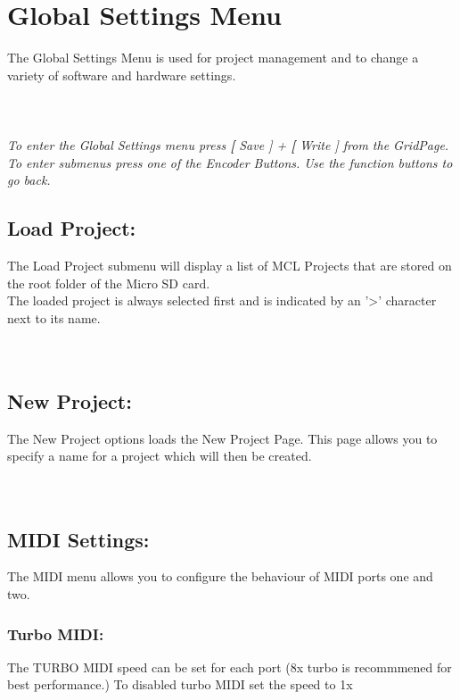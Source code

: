 \chapter{Global Settings Menu}
The Global Settings Menu is used for project management and to change a variety of software and hardware settings.\\\\
\\\\
\textit{To enter the Global Settings menu press \textbf[ Save ] + \textbf[ Write ] from the GridPage.\\
To enter submenus press one of the Encoder Buttons. Use the function buttons to go back.}
\section{Load Project:}
The Load Project submenu will display a list of MCL Projects that are stored on the root folder of the Micro SD card. \\
The loaded project is always selected first and is indicated by an '>' character next to its name.\\\\
\\
\section{New Project:}
The New Project options loads the New Project Page. This page allows you to specify a name for a project which will then be created.\\\\
\\
\section{MIDI Settings:}
The MIDI menu allows you to configure the behaviour of MIDI ports one and two.\\

\subsection{Turbo MIDI:}
The TURBO MIDI speed can be set for each port (8x turbo is recommmened for best performance.) To disabled turbo MIDI set the speed to 1x
